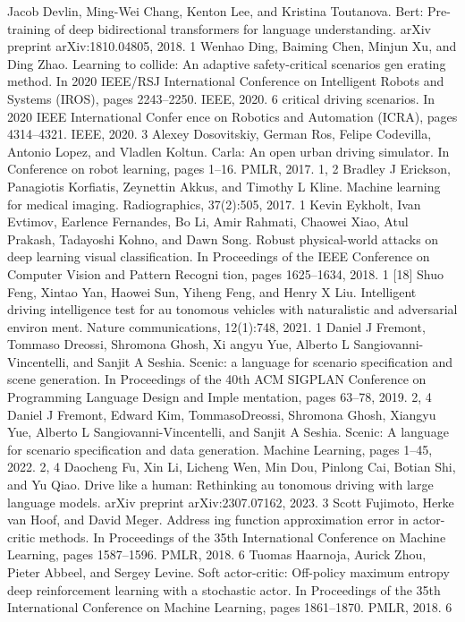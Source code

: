 \documentclass{article}
\begin{document}
\begin{thebibliography}{99}
	Jacob Devlin, Ming-Wei Chang, Kenton Lee, and Kristina Toutanova. Bert: Pre-training of deep bidirectional transformers for language understanding. arXiv preprint arXiv:1810.04805, 2018. 1 
	Wenhao Ding, Baiming Chen, Minjun Xu, and Ding Zhao. Learning to collide: An adaptive safety-critical scenarios gen erating method. In 2020 IEEE/RSJ International Conference on Intelligent Robots and Systems (IROS), pages 2243–2250. IEEE, 2020. 6 critical driving scenarios. In 2020 IEEE International Confer ence on Robotics and Automation (ICRA), pages 4314–4321. IEEE, 2020. 3
	Alexey Dosovitskiy, German Ros, Felipe Codevilla, Antonio Lopez, and Vladlen Koltun. Carla: An open urban driving simulator. In Conference on robot learning, pages 1–16. PMLR, 2017. 1, 2
	Bradley J Erickson, Panagiotis Korfiatis, Zeynettin Akkus, and Timothy L Kline. Machine learning for medical imaging. Radiographics, 37(2):505, 2017. 1
	Kevin Eykholt, Ivan Evtimov, Earlence Fernandes, Bo Li, Amir Rahmati, Chaowei Xiao, Atul Prakash, Tadayoshi Kohno, and Dawn Song. Robust physical-world attacks on deep learning visual classification. In Proceedings of the IEEE Conference on Computer Vision and Pattern Recogni tion, pages 1625–1634, 2018. 1 [18] Shuo Feng, Xintao Yan, Haowei Sun, Yiheng Feng, and Henry X Liu. Intelligent driving intelligence test for au tonomous vehicles with naturalistic and adversarial environ ment. Nature communications, 12(1):748, 2021. 1 
	Daniel J Fremont, Tommaso Dreossi, Shromona Ghosh, Xi angyu Yue, Alberto L Sangiovanni-Vincentelli, and Sanjit A Seshia. Scenic: a language for scenario specification and scene generation. In Proceedings of the 40th ACM SIGPLAN Conference on Programming Language Design and Imple mentation, pages 63–78, 2019. 2, 4 
	Daniel J Fremont, Edward Kim, TommasoDreossi, Shromona Ghosh, Xiangyu Yue, Alberto L Sangiovanni-Vincentelli, and Sanjit A Seshia. Scenic: A language for scenario specification and data generation. Machine Learning, pages 1–45, 2022. 2, 4
	Daocheng Fu, Xin Li, Licheng Wen, Min Dou, Pinlong Cai, Botian Shi, and Yu Qiao. Drive like a human: Rethinking au tonomous driving with large language models. arXiv preprint arXiv:2307.07162, 2023. 3 
	Scott Fujimoto, Herke van Hoof, and David Meger. Address ing function approximation error in actor-critic methods. In Proceedings of the 35th International Conference on Machine Learning, pages 1587–1596. PMLR, 2018. 6 
	Tuomas Haarnoja, Aurick Zhou, Pieter Abbeel, and Sergey Levine. Soft actor-critic: Off-policy maximum entropy deep reinforcement learning with a stochastic actor. In Proceedings of the 35th International Conference on Machine Learning, pages 1861–1870. PMLR, 2018. 6

\end{thebibliography}
\end{document}
